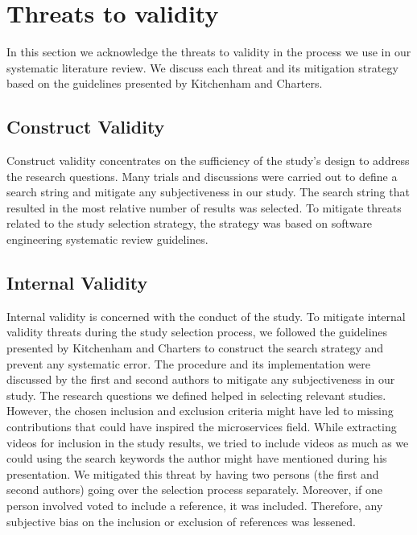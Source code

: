 
\section{Threats to validity}\label{sec:threats}
In this section we acknowledge the threats to validity in the process we use in our systematic
literature review. We discuss each threat and its mitigation strategy based on the guidelines presented by Kitchenham and Charters.\cite{Kitchenham2007}


\subsection{Construct Validity} 
Construct validity concentrates on the sufficiency of the study's design to address the research questions. Many trials and discussions were carried out to define a search string and mitigate any subjectiveness in our study. The search string that resulted in the most relative number of results was selected. To mitigate threats related to the study selection strategy, the strategy was based on software engineering systematic review guidelines.\cite{kitchenham2015}

 
\subsection{Internal Validity} 
Internal validity is concerned with the conduct of the study. To mitigate internal validity threats during the study selection process, we followed the guidelines presented by Kitchenham and Charters\cite{Kitchenham2007} to construct the search strategy and prevent any systematic error.
The procedure and its implementation were discussed by the first and second authors to mitigate any subjectiveness in our study. The research questions we defined helped in selecting relevant studies. However, the chosen inclusion and exclusion criteria might have led to missing contributions that could have inspired the microservices field. While extracting videos for inclusion in the study results, we tried to include videos as much as we could using the search keywords the author might have mentioned during his presentation. We mitigated this threat by having two persons (the first and second authors) going over the selection process separately. Moreover, if one person involved voted to include a reference, it was included. Therefore, any subjective bias on the inclusion or exclusion of references was lessened. 

